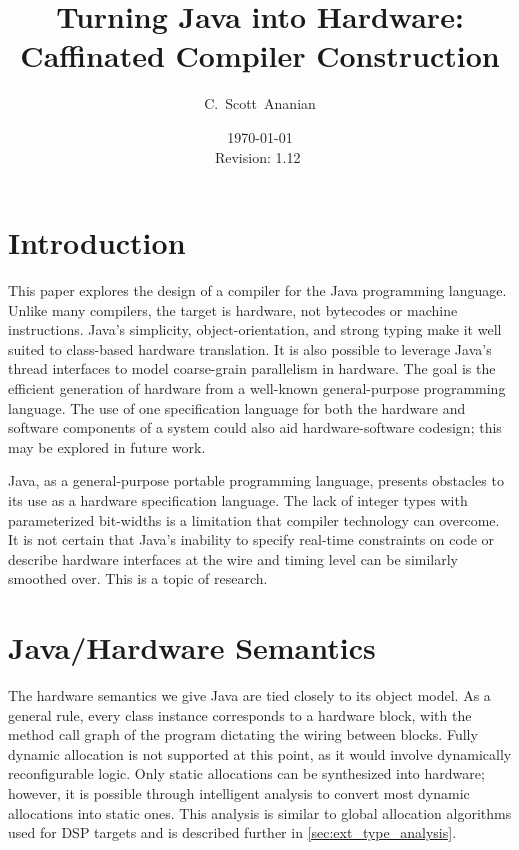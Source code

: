 \documentclass[11pt,notitlepage,twocolumn]{article}
\author{C.~Scott~Ananian}
\title{Turning Java into Hardware: \\ Caffinated Compiler Construction}
\date{\today \\ $ $Revision: 1.12 $ $}
\begin{document}

\maketitle

\section{Introduction}
This paper explores the design of a compiler for the Java
programming language.  Unlike many compilers, the target is hardware,
not bytecodes or machine instructions.
Java's simplicity, object-orientation, and
strong typing make it well suited to class-based hardware
translation.  It is also possible to leverage Java's thread interfaces
to model coarse-grain parallelism in hardware.  The goal is the
efficient generation of hardware from a well-known general-purpose
programming language.  The use of one specification language for both
the hardware and software components of a system could also aid
hardware-software codesign; this may be explored in future work.

Java, as a general-purpose portable programming language, 
presents obstacles to its use as a hardware specification language.
The lack of integer types with parameterized bit-widths is a
limitation that compiler technology can overcome.  It is not certain
that Java's inability to specify real-time constraints on code or
describe hardware interfaces at the wire and timing level can be
similarly smoothed over.  This is a topic of research.

\section{Java/Hardware Semantics}
The hardware semantics we give Java are tied closely to its object model.
As a general rule, every class instance corresponds to a hardware
block, with the method call graph of the program dictating the wiring
between blocks.  Fully dynamic allocation is not supported at this
point, as it would involve dynamically reconfigurable logic.  Only
static allocations can be synthesized into hardware; however, it is
possible through intelligent analysis to convert most dynamic
allocations into static ones.  This analysis is similar to 
global allocation algorithms used
for DSP targets \cite{DSP_targets} and is
described further in \ref{sec:ext_type_analysis}.
\end{document}
